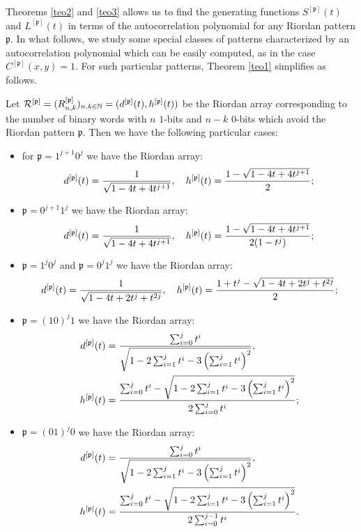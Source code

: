 Theorems \ref{teo2} and \ref{teo3} allows us to find the generating functions $S^{[\mathfrak{p}]}(t)$ and $L^{[\mathfrak{p}]}(t)$
 in terms of the autocorrelation polynomial for any Riordan pattern $\mathfrak{p}.$
 In what follows, we study some special classes of patterns characterized by an autocorrelation polynomial which can be easily computed, as
 in the case $C^{[\mathfrak{p}]}(x,y)=1.$
For such particular patterns, Theorem \ref{teo1} simplifies as follows.

\begin{corollary}
\label{corodh}
Let  ${\cal{R}^{[\mathfrak{p}]}}=(R_{n, k}^{[\mathfrak{p}]})_{n,k\in\mathbb{N}}=(d^{[\mathfrak{p}]}(t),h^{[\mathfrak{p}]}(t))$  be the
Riordan array corresponding to the number of binary words with $n$ $1$-bits  and
$n-k$  $0$-bits  which avoid the Riordan pattern $\mathfrak{p}.$ Then we have
the following particular cases:
\begin{itemize}

\item for $\mathfrak{p}=1^{j+1}0^j$ we have the Riordan array:
$$ d^{[\mathfrak{p}]}(t)={1 \over \sqrt{1-4t+4t^{j+1}}}, \quad h^{[\mathfrak{p}]}(t)={1 -\sqrt{1-4t+4t^{j+1}} \over 2 };$$

\item $\mathfrak{p}=0^{j+1}1^j$ we have the Riordan array:
$$ d^{[\mathfrak{p}]}(t)={1 \over \sqrt{1-4t+4t^{j+1}}}, \quad h^{[\mathfrak{p}]}(t)={1 -\sqrt{1-4t+4t^{j+1}} \over 2(1-t^j) };$$

\item $\mathfrak{p}=1^{j}0^j$ and $\mathfrak{p}=0^{j}1^j$ we have the Riordan array:
$$ d^{[\mathfrak{p}]}(t)={1 \over \sqrt{1-4t+2t^j+t^{2j}}}, \quad h^{[\mathfrak{p}]}(t)={{1+t^j -\sqrt{1-4t+2t^j+t^{2j}} } \over 2 };$$

\item $\mathfrak{p}=(10)^j1$ we have the Riordan array:
\begin{displaymath}
\begin{split}
d^{[\mathfrak{p}]}(t) &= { \sum_{i=0}^j t^i \over \sqrt{1-2\sum_{i=1}^jt^i-3 \left( \sum_{i=1}^j t^i \right)^2}},\\
h^{[\mathfrak{p}]}(t) &= {\sum_{i=0}^jt^i -\sqrt{1-2\sum_{i=1}^jt^i-3\left( \sum_{i=1}^j t^i \right)^2} \over 2 \sum_{i=0}^jt^i};
\end{split}
\end{displaymath}

\item $\mathfrak{p}=(01)^j0$ we have the Riordan array:
\begin{displaymath}
\begin{split}
d^{[\mathfrak{p}]}(t) &= { \sum_{i=0}^j t^i \over \sqrt{1-2\sum_{i=1}^jt^i-3 \left( \sum_{i=1}^j t^i \right)^2}},\\
h^{[\mathfrak{p}]}(t) &= {\sum_{i=0}^jt^i -\sqrt{1-2\sum_{i=1}^jt^i-3\left( \sum_{i=1}^j t^i \right)^2} \over 2 \sum_{i=0}^{j-1}t^i}.
\end{split}
\end{displaymath}

\end{itemize}
\end{corollary}

